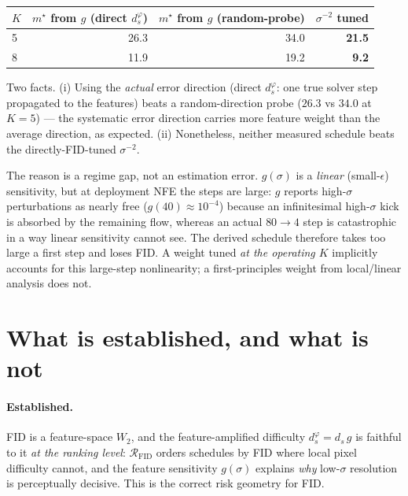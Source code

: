 \documentclass[11pt]{article}
\begin{document}
\begin{center}
\small
\begin{tabular}{l r r r}
\toprule
$K$ & $m^{\star}$ from $g$ (direct $d_s^{\varphi}$) & $m^{\star}$ from $g$ (random-probe) & $\sigma^{-2}$ tuned \\
\midrule
5 & 26.3 & 34.0 & \textbf{21.5} \\
8 & 11.9 & 19.2 & \textbf{9.2} \\
\bottomrule
\end{tabular}
\end{center}

\noindent
Two facts. (i) Using the \emph{actual} error direction (direct
$d_s^{\varphi}$: one true solver step propagated to the features) beats a
random-direction probe ($26.3$ vs $34.0$ at $K{=}5$) --- the systematic
error direction carries more feature weight than the average direction,
as expected. (ii) Nonetheless, neither measured schedule beats the
directly-FID-tuned $\sigma^{-2}$.

The reason is a regime gap, not an estimation error. $g(\sigma)$ is a
\emph{linear} (small-$\epsilon$) sensitivity, but at deployment NFE the
steps are large: $g$ reports high-$\sigma$ perturbations as nearly free
($g(40)\!\approx\!10^{-4}$) because an infinitesimal high-$\sigma$ kick is
absorbed by the remaining flow, whereas an actual $80\!\to\!4$ step is
catastrophic in a way linear sensitivity cannot see. The derived schedule
therefore takes too large a first step and loses FID. A weight tuned
\emph{at the operating $K$} implicitly accounts for this large-step
nonlinearity; a first-principles weight from local/linear analysis does
not.

\section{What is established, and what is not}
\label{sec:scope}

\paragraph{Established.} FID is a feature-space $W_2$, and the
feature-amplified difficulty $d_s^{\varphi}=d_s\,g$ is faithful to it
\emph{at the ranking level}: $\mathcal R_{\mathrm{FID}}$ orders schedules
by FID where local pixel difficulty cannot, and the feature sensitivity
$g(\sigma)$ explains \emph{why} low-$\sigma$ resolution is perceptually
decisive. This is the correct risk geometry for FID.
\end{document}
